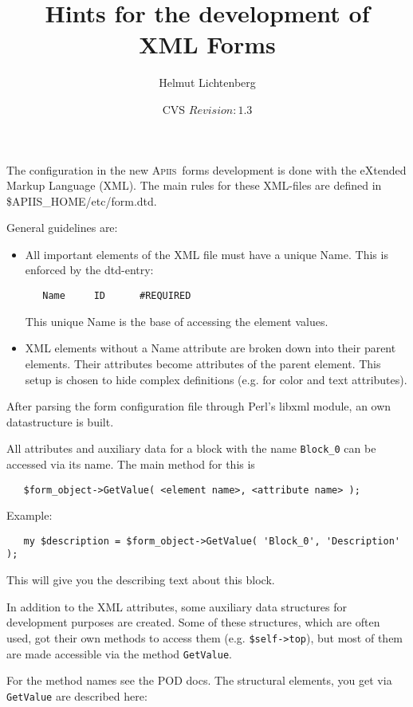 \documentclass[a4paper,11pt]{scrartcl}
\title{Hints for the development of \\ \apiis XML Forms}
\author{Helmut Lichtenberg}
\date{CVS $Revision: 1.3 $}
\newcommand{\apiis}{\mbox{\textsc{Apiis} }}
\begin{document}
\maketitle
\thispagestyle{empty}

The configuration in the new \apiis forms development is done with the
eXtended Markup Language (XML). The main rules for these XML-files are
defined in \$APIIS\_HOME/etc/form.dtd.

General guidelines are:
\begin{itemize}
   \item All important elements of the XML file must have a unique Name.
         This is enforced by the dtd-entry:

         \verb+   Name     ID      #REQUIRED+

         This unique Name is the base of accessing the element values.

   \item XML elements without a Name attribute are broken down into their
         parent elements. Their attributes become attributes of the parent
         element. This setup is chosen to hide complex definitions (e.g.
         for color and text attributes).
\end{itemize}

After parsing the form configuration file through Perl's libxml module, an
own datastructure is built.

All attributes and auxiliary data for a block with the name \verb+Block_0+
can be accessed via its name. The main method for this is

\verb+   $form_object->GetValue( <element name>, <attribute name> );+

Example:

\verb+   my $description = $form_object->GetValue( 'Block_0', 'Description' );+

This will give you the describing text about this block.

In addition to the XML attributes, some auxiliary data structures for
development purposes are created. Some of these structures, which are often
used, got their own methods to access them (e.g. \verb+$self->top+), but
most of them are made accessible via the method \verb+GetValue+.

For the method names see the POD docs.
The structural elements, you get via \verb+GetValue+ are described here:
\end{document}
